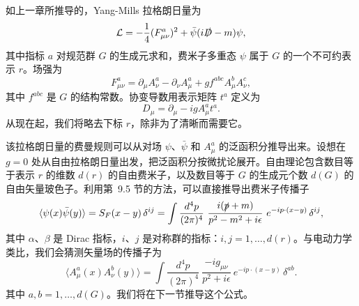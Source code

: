 如上一章所推导的，Yang-Mills 拉格朗日量为
\begin{equation}
  \mathcal{L} = -\frac{1}{4}(F^a_{\mu\nu})^2 + \bar{\psi}(i\slashed{D}
    - m)\psi ,
  \label{eq:16.1}
\end{equation}
其中指标 $a$ 对规范群 $G$ 的生成元求和，费米子多重态 $\psi$ 属于 $G$ 的一个不可约表示 $r$。场强为
\begin{equation}
  F^a_{\mu\nu} = \partial_\mu A^a_\nu - \partial_\nu A^a_\mu
    + gf^{abc}A^b_\mu A^c_\nu ,
  \label{eq:16.2}
\end{equation}
其中 $f^{abc}$ 是 $G$ 的结构常数。协变导数用表示矩阵 $t^a$ 定义为
\begin{equation}
  D_\mu = \partial_\mu - igA^a_\mu t^a .
  \label{eq:16.3}
\end{equation}
从现在起，我们将略去下标 $r$，除非为了清晰而需要它。

该拉格朗日量的费曼规则可以从对场 $\psi$、$\bar{\psi}$ 和 $A^a_\mu$ 的泛函积分推导出来。设想在 $g = 0$ 处从自由拉格朗日量出发，把泛函积分按微扰论展开。自由理论包含数目等于表示 $r$ 的维数 $d(r)$ 的自由费米子，以及数目等于 $G$ 的生成元个数 $d(G)$ 的自由矢量玻色子。利用第~9.5 节的方法，可以直接推导出费米子传播子
\begin{equation}
  \langle\psi(x)\bar{\psi}(y)\rangle = S_F(x-y)\,\delta^{ij}
  = \int \frac{d^4p}{(2\pi)^4}\ \frac{i(\slashed{p}+m)}{p^2-m^2+i\epsilon}\
    e^{-ip\cdot(x-y)}\,\delta^{ij} ,
  \label{eq:16.4}
\end{equation}
其中 $\alpha$、$\beta$ 是 Dirac 指标，$i$、$j$ 是对称群的指标：$i, j = 1, \ldots, d(r)$。与电动力学类比，我们会猜测矢量场的传播子为
\begin{equation}
  \langle A^a_\mu(x)A^b_\nu(y)\rangle
  = \int \frac{d^4p}{(2\pi)^4}\ \frac{-ig_{\mu\nu}}{p^2+i\epsilon}\
    e^{-ip\cdot(x-y)}\,\delta^{ab} .
  \label{eq:16.5}
\end{equation}
其中 $a, b = 1, \ldots, d(G)$。我们将在下一节推导这个公式。


